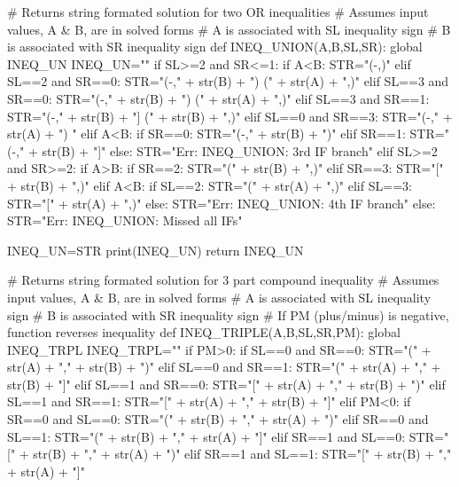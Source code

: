 \documentclass{article}%
\begin{document}
\begin{sagesilent}
 
# Returns string formated solution for two OR inequalities  
# Assumes input values, A & B, are in solved forms
# A is associated with SL inequality sign 
# B is associated with SR inequality sign  
def INEQ_UNION(A,B,SL,SR):
  global INEQ_UN
  INEQ_UN=""
  if SL>=2 and SR<=1:
    if A<B: STR="(-\infty,\infty)"
    elif SL==2 and SR==0:   STR="(-\infty," + str(B) + ") \cup (" + str(A) + ",\infty)"
    elif SL==3 and SR==0:   STR="(-\infty," + str(B) + ") \cup [" + str(A) + ",\infty)"
    elif SL==2 and SR==1:   STR="(-\infty," + str(B) + "] \cup (" + str(A) + ",\infty)"
    elif SL==3 and SR==1:   STR="(-\infty," + str(B) + "] \cup [" + str(A) + ",\infty)"
    else: STR="Err: INEQ_UNION: 1st IF branch"   
  elif SL<=1 and SR>=2:
    if A>B: STR="(-\infty,\infty)"
    elif SL==0 and SR==2:   STR="(-\infty," + str(A) + ") \cup (" + str(B) + ",\infty)" 
    elif SL==1 and SR==2:   STR="(-\infty," + str(A) + "] \cup (" + str(B) + ",\infty)"
    elif SL==0 and SR==3:   STR="(-\infty," + str(A) + ") \cup [" + str(B) + ",\infty)"
    elif SL==1 and SR==3:   STR="(-\infty," + str(A) + "] \cup [" + str(B) + ",\infty)"    
    else: STR="Err: INEQ_UNION: 2nd IF branch"   
  elif SL<=1 and SR<=1:
    if A>B:
      if SL==0:   STR="(-\infty," + str(A) + ")"
      elif SL==1:   STR="(-\infty," + str(A) + "]"
    elif A<B:
      if SR==0:   STR="(-\infty," + str(B) + ")"
      elif SR==1:   STR="(-\infty," + str(B) + "]"      
    else: STR="Err: INEQ_UNION: 3rd IF branch"  
  elif SL>=2 and SR>=2:
    if A>B:
      if SR==2:     STR="(" + str(B) + ",\infty)"
      elif SR==3:   STR="[" + str(B) + ",\infty)"
    elif A<B:
      if SL==2:     STR="(" + str(A) + ",\infty)"
      elif SL==3:   STR="[" + str(A) + ",\infty)"
    else: STR="Err: INEQ_UNION: 4th IF branch"
  else:
    STR="Err: INEQ_UNION: Missed all IFs"
    
  INEQ_UN=STR
  print(INEQ_UN)
  return INEQ_UN 

# Returns string formated solution for 3 part compound inequality  
# Assumes input values, A & B, are in solved forms
# A is associated with SL inequality sign 
# B is associated with SR inequality sign
# If PM (plus/minus) is negative, function reverses inequality
def INEQ_TRIPLE(A,B,SL,SR,PM): 
  global INEQ_TRPL
  INEQ_TRPL="" 
  if PM>0:
    if   SL==0 and SR==0:    STR="(" + str(A) + "," + str(B) + ")"
    elif SL==0 and SR==1:    STR="(" + str(A) + "," + str(B) + "]"
    elif SL==1 and SR==0:    STR="[" + str(A) + "," + str(B) + ")"
    elif SL==1 and SR==1:    STR="[" + str(A) + "," + str(B) + "]"
  elif PM<0:
    if   SR==0 and SL==0:    STR="(" + str(B) + "," + str(A) + ")"
    elif SR==0 and SL==1:    STR="(" + str(B) + "," + str(A) + "]"
    elif SR==1 and SL==0:    STR="[" + str(B) + "," + str(A) + ")"
    elif SR==1 and SL==1:    STR="[" + str(B) + "," + str(A) + "]"
  

\end{sagesilent}
\end{document}
